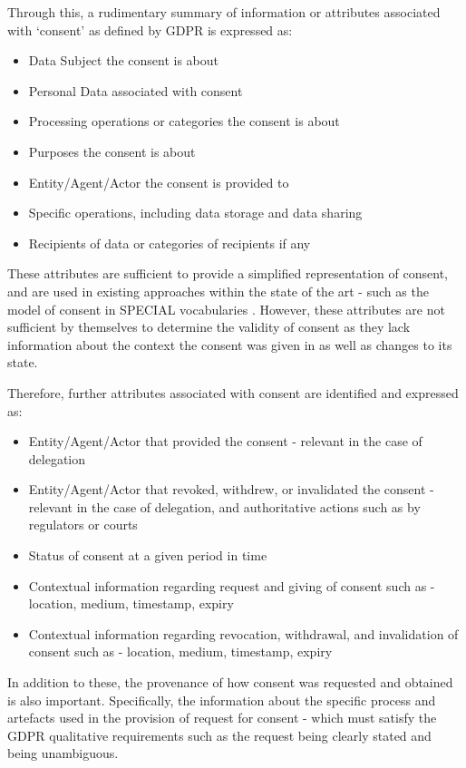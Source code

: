 Through this, a rudimentary summary of information or attributes associated with `consent' as defined by GDPR is expressed as:
\begin{itemize}
    \item Data Subject the consent is about
    \item Personal Data associated with consent
    \item Processing operations or categories the consent is about
    \item Purposes the consent is about
    \item Entity/Agent/Actor the consent is provided to
    \item Specific operations, including data storage and data sharing
    \item Recipients of data or categories of recipients if any
\end{itemize}
These attributes are sufficient to provide a simplified representation of consent, and are used in existing approaches within the state of the art - such as the model of consent in SPECIAL vocabularies \cite{bonatti_special_2018}. However, these attributes are not sufficient by themselves to determine the validity of consent as they lack information about the context the consent was given in as well as changes to its state.

Therefore, further attributes associated with consent are identified and expressed as:
\begin{itemize}
    \item Entity/Agent/Actor that provided the consent - relevant in the case of delegation
    \item Entity/Agent/Actor that revoked, withdrew, or invalidated the consent - relevant in the case of delegation, and authoritative actions such as by regulators or courts
    \item Status of consent at a given period in time
    \item Contextual information regarding request and giving of consent such as - location, medium, timestamp, expiry
    \item Contextual information regarding revocation, withdrawal, and invalidation of consent such as - location, medium, timestamp, expiry
\end{itemize}
In addition to these, the provenance of how consent was requested and obtained is also important.
Specifically, the information about the specific process and artefacts used in the provision of request for consent - which must satisfy the GDPR qualitative requirements such as the request being clearly stated and being unambiguous.

